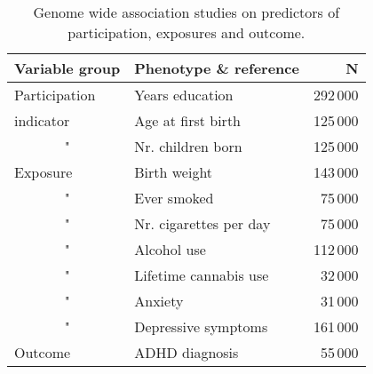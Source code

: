 
\begin{table}[ht]
	\begin{center}
		\begin{tabular}{llr}
			\hline
			Variable group        & Phenotype \& reference           & N \\
			\hline
			Participation         & Years education\cite{Okbay2016-mg} 	   & 292\,000\\
			indicator             & Age at first birth\cite{Barban2016-fa}       & 125\,000\\
			\multicolumn{1}{c}{"} & Nr. children born\cite{Barban2016-fa}       & 125\,000\\
			Exposure              & Birth weight\cite{Horikoshi2016-hq}    & 143\,000\\
			\multicolumn{1}{c}{"} & Ever smoked\cite{Tob_Gen_Cons2010-se} & 75\,000\\
			\multicolumn{1}{c}{"} & Nr. cigarettes per day\cite{Tob_Gen_Cons2010-se} & 75\,000\\
			\multicolumn{1}{c}{"} & Alcohol use\cite{Clarke2017-xz}       & 112\,000\\
			\multicolumn{1}{c}{"} & Lifetime cannabis use\cite{Stringer2016-or}     & 32\,000\\
			\multicolumn{1}{c}{"} & Anxiety\cite{Otowa2016-uo}        & 31\,000\\
			\multicolumn{1}{c}{"} & Depressive symptoms\cite{Okbay2016-pj}        & 161\,000\\
			Outcome               & ADHD diagnosis\cite{Demontis2017-zu}     & 55\,000\\
			\hline
		\end{tabular}
	\end{center}
	\caption{Genome wide association studies on predictors of participation, exposures and outcome.}
	\label{tab:gwas}
\end{table}

